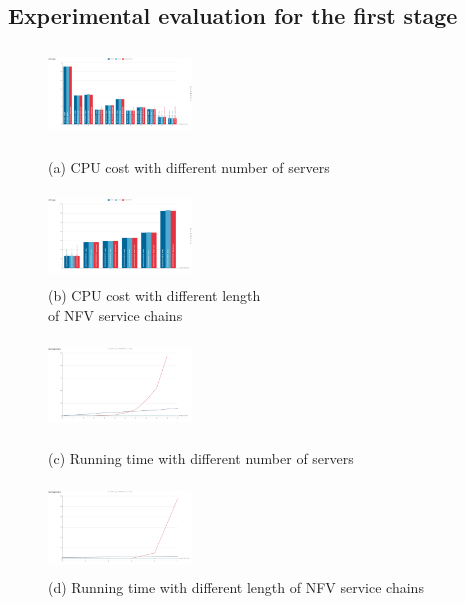 \documentclass{acmtog}
\begin{document}
\subsection{Experimental evaluation for the first stage}

\begin{figure}[!h]
    \begin{minipage}[t]{0.5\linewidth}
    \centering
    \includegraphics[height=2.4cm,width=3.8cm]{3.png}
    \caption*{(a) CPU cost with different number of servers}
    \label{fig:CPU cost with different number of servers}
    \end{minipage}
    \begin{minipage}[t]{0.5\linewidth}
    \centering
    \includegraphics[height=2.4cm,width=3.8cm]{4.png}
    \caption*{(b) CPU cost with different length \\of NFV service chains}
    \label{fig:CPU cost with different length of NFV service chains}
    \end{minipage}
\end{figure}

\begin{figure}[!h]
    \begin{minipage}[t]{0.5\linewidth}
    \centering
    \includegraphics[height=2.4cm,width=3.8cm]{5.png}
    \caption*{(c) Running time with different number of servers}
    \label{fig:Running time with different number of servers}
    \end{minipage}
    \begin{minipage}[t]{0.5\linewidth}
    \centering
    \includegraphics[height=2.4cm,width=3.8cm]{6.png}
    \caption*{(d) Running time with different length of NFV service chains}
    \label{fig:Running time with different length of NFV service chains}
    \end{minipage}
\end{figure}
\end{document}
